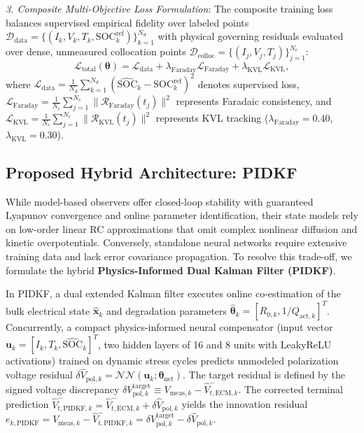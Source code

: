 \documentclass[balance,nocopyright,upint,varvw,hyphenate,barcolor=NavyBlue,nolists]{asmejour}
\begin{document}
\emph{3. Composite Multi-Objective Loss Formulation}: The composite training loss balances supervised empirical fidelity over labeled points $\mathcal{D}_{\text{data}} = \{(I_k, V_k, T_k, \text{SOC}_k^{\text{ref}})\}_{k=1}^{N_d}$ with physical governing residuals evaluated over dense, unmeasured collocation points $\mathcal{D}_{\text{colloc}} = \{(I_j, V_j, T_j)\}_{j=1}^{N_c}$:
\begin{equation}\label{eqn:pinn_loss}
\mathcal{L}_{\text{total}}(\boldsymbol{\theta}) = \mathcal{L}_{\text{data}} + \lambda_{\text{Faraday}} \mathcal{L}_{\text{Faraday}} + \lambda_{\text{KVL}} \mathcal{L}_{\text{KVL}},
\end{equation}
where $\mathcal{L}_{\text{data}} = \frac{1}{N_d} \sum_{k=1}^{N_d} (\widehat{\text{SOC}}_k - \text{SOC}_k^{\text{ref}})^2$ denotes supervised loss, $\mathcal{L}_{\text{Faraday}} = \frac{1}{N_c} \sum_{j=1}^{N_c} \|\mathcal{R}_{\text{Faraday}}(t_j)\|^2$ represents Faradaic consistency, and $\mathcal{L}_{\text{KVL}} = \frac{1}{N_c} \sum_{j=1}^{N_c} \|\mathcal{R}_{\text{KVL}}(t_j)\|^2$ represents KVL tracking ($\lambda_{\text{Faraday}} = 0.40$, $\lambda_{\text{KVL}} = 0.30$).

\subsection{Proposed Hybrid Architecture: PIDKF}
While model-based observers offer closed-loop stability with guaranteed Lyapunov convergence and online parameter identification, their state models rely on low-order linear RC approximations that omit complex nonlinear diffusion and kinetic overpotentials. Conversely, standalone neural networks require extensive training data and lack error covariance propagation. To resolve this trade-off, we formulate the hybrid \textbf{Physics-Informed Dual Kalman Filter (PIDKF)}.

In PIDKF, a dual extended Kalman filter executes online co-estimation of the bulk electrical state $\hat{\mathbf{x}}_k$ and degradation parameters $\hat{\boldsymbol{\theta}}_k = [R_{0,k}, 1/Q_{\text{act},k}]^T$. Concurrently, a compact physics-informed neural compensator (input vector $\mathbf{u}_k = [I_k, T_k, \widehat{\text{SOC}}_k]^T$, two hidden layers of 16 and 8 units with LeakyReLU activations) trained on dynamic stress cycles predicts unmodeled polarization voltage residual $\delta \hat{V}_{\text{pol},k} = \mathcal{NN}(\mathbf{u}_k; \boldsymbol{\theta}_{\text{net}})$. The target residual is defined by the signed voltage discrepancy $\delta V_{\text{pol},k}^{\text{target}} \equiv V_{\text{meas},k} - \hat{V}_{t,\text{ECM},k}^-$. The corrected terminal prediction $\hat{V}_{t,\text{PIDKF},k}^- = \hat{V}_{t,\text{ECM},k}^- + \delta \hat{V}_{\text{pol},k}$ yields the innovation residual $e_{k,\text{PIDKF}} = V_{\text{meas},k} - \hat{V}_{t,\text{PIDKF},k}^- = \delta V_{\text{pol},k}^{\text{target}} - \delta \hat{V}_{\text{pol},k}$.
\end{document}
